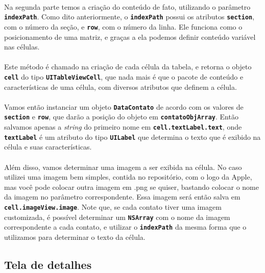 \documentclass[a4paper,12pt,brazil,doubleside]{book}
\begin{document}
\paragraph{}Na segunda parte temos a criação do conteúdo de fato, utilizando o parâmetro \texttt{\textbf{indexPath}}. Como dito anteriormente, o \texttt{\textbf{indexPath}} possui os atributos \texttt{\textbf{section}}, com o número da seção, e \texttt{\textbf{row}}, com o número da linha. Ele funciona como o posicionamento de uma matriz, e graças a ela podemos definir conteúdo variável nas células.
\paragraph{}Este método é chamado na criação de cada célula da tabela, e retorna o objeto \texttt{\textbf{cell}} do tipo \texttt{\textbf{UITableViewCell}}, que nada mais é que o pacote de conteúdo e características de uma célula, com diversos atributos que definem a célula.
\paragraph{}Vamos então instanciar um objeto \texttt{\textbf{DataContato}} de acordo com os valores de \texttt{\textbf{section}} e \texttt{\textbf{row}}, que darão a posição do objeto em \texttt{\textbf{contatoObjArray}}. Então salvamos apenas a \emph{string} do primeiro nome em \texttt{\textbf{cell.textLabel.text}}, onde \texttt{\textbf{textLabel}} é um atributo do tipo \texttt{\textbf{UILabel}} que determina o texto que é exibido na célula e suas características.
\paragraph{}Além disso, vamos determinar uma imagem a ser exibida na célula. No caso utilizei uma imagem bem simples, contida no repositório, com o logo da Apple, mas você pode colocar outra imagem em .png se quiser, bastando colocar o nome da imagem no parâmetro correspondente. Essa imagem será então salva em \texttt{\textbf{cell.imageView.image}}. Note que, se cada contato tiver uma imagem customizada, é possível determinar um \texttt{\textbf{NSArray}} com o nome da imagem correspondente a cada contato, e utilizar o \texttt{\textbf{indexPath}} da mesma forma que o utilizamos para determinar o texto da célula.

\bigskip

\subsection{Tela de detalhes}
\end{document}

